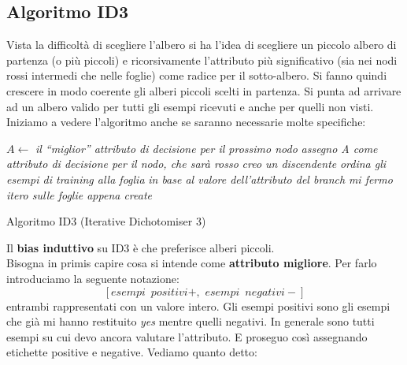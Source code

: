 \documentclass[a4paper,12pt, oneside]{book}
\begin{document}
\subsection{Algoritmo ID3}
Vista la difficoltà di scegliere l'albero si ha l'idea di scegliere un piccolo
albero di partenza (o più piccoli) e ricorsivamente l'attributo più
significativo (sia nei nodi rossi intermedi che nelle foglie) come radice per il
sotto-albero. Si fanno quindi crescere in modo 
coerente gli alberi piccoli scelti in partenza. Si punta ad arrivare ad un
albero valido per tutti gli esempi ricevuti e anche per quelli non visti.\\
Iniziamo a vedere l'algoritmo anche se saranno necessarie molte specifiche:
\begin{algorithm}[H]
  \begin{algorithmic}
    \State $A \gets$ \textit{il ``miglior'' attributo di decisione per il
    prossimo nodo}
    \State \textit{assegno A come attributo di decisione per il nodo, che sarà
    rosso}
    \State \textit{creo un discendente}
    \EndFor
    \State \textit{ordina gli esempi di training alla foglia}
    \State \textit{in base al valore dell'attributo del branch}
    \State \textit{mi fermo}
    \Else
    \State \textit{itero sulle foglie appena create}
    \EndIf
    \EndFunction
  \end{algorithmic}
  \caption{Algoritmo ID3 (Iterative Dichotomiser 3)}
\end{algorithm}
Il \textbf{bias induttivo} su ID3 è che preferisce alberi piccoli.\\
Bisogna in primis capire cosa si intende come \textbf{attributo migliore}. Per
farlo introduciamo la seguente notazione:
\[[esempi\,\,\,positivi+,\,\,esempi\,\,\,negativi-]\]
entrambi rappresentati con un valore intero. Gli esempi positivi sono gli esempi
che già mi hanno restituito \textit{yes} mentre quelli negativi. In generale
sono tutti esempi su cui devo ancora valutare l'attributo. E proseguo così
assegnando etichette positive e negative.
Vediamo quanto detto:

\begin{figure}[H]
  \centering
\end{figure}
\end{document}
